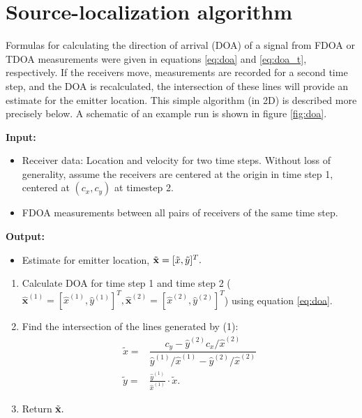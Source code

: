 \section{Source-localization algorithm}
\label{s:algorithm}
Formulas for calculating the direction of arrival (DOA) of a signal from FDOA or TDOA measurements were given in equations \ref{eq:doa} and \ref{eq:doa_t}, respectively. If the receivers move, measurements are recorded for a second time step, and the DOA is recalculated, the intersection of these lines will provide an estimate for the emitter location. This simple algorithm (in 2D) is described more precisely below. A schematic of an example run is shown in figure \ref{fig:doa}.
\begin{framed}
\noindent\textbf{Input:}
\begin{itemize}
  \item Receiver data: Location and velocity for two time steps. Without loss of generality, assume the receivers are centered at the origin in time step 1, centered at $(c_x,c_y)$ at timestep 2.
  \item FDOA measurements between all pairs of receivers of the same time step.
\end{itemize}
\textbf{Output:}
\begin{itemize}
  \item Estimate for emitter location, $\tilde{\mathbf{x}}=[\tilde{x},\tilde{y}]^T.$
\end{itemize}
\vspace{1ex}
\begin{enumerate}
  \item Calculate DOA for time step 1 and time step 2 ($\hat{\mathbf{x}}^{(1)}=[\hat{x}^{(1)},\hat{y}^{(1)}]^T,\hat{\mathbf{x}}^{(2)}=[\hat{x}^{(2)},\hat{y}^{(2)}]^T$) using equation \ref{eq:doa}.
  \item Find the intersection of the lines generated by (1):
  \begin{align*}
    \tilde{x} =& \dfrac{c_y - \hat{y}^{(2)}c_x/\hat{x}^{(2)}}{\hat{y}^{(1)}/\hat{x}^{(1)}-\hat{y}^{(2)}/\hat{x}^{(2)}} \\
    \tilde{y} =& \frac{\hat{y}^{(1)}}{\hat{x}^{(1)}}\cdot\tilde{x}.
  \end{align*}
  \item Return $\tilde{\mathbf{x}}.$
\end{enumerate}
\end{framed}
